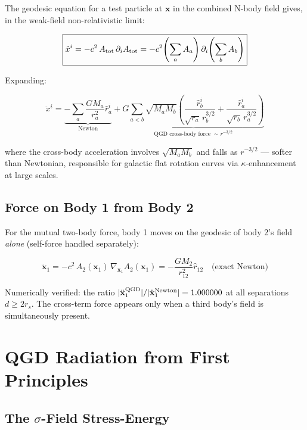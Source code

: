 \documentclass[11pt,a4paper]{article}
\theoremstyle{definition}
\theoremstyle{remark}
\newcommand{\boldx}{\mathbf{x}}
\begin{document}
	The geodesic equation for a test particle at $\boldx$ in the combined
	N-body field gives, in the weak-field non-relativistic limit:
	
	\begin{equation}\label{eq:eom_Nbody}
		\boxed{
			\ddot{x}^i = -c^2\,A_{\rm tot}\,\partial_i A_{\rm tot}
			= -c^2\!\left(\sum_a A_a\right)\partial_i\!\left(\sum_b A_b\right)
		}
	\end{equation}
	
	Expanding:
	
	\begin{equation}\label{eq:eom_expanded}
		\ddot{x}^i
		= \underbrace{-\sum_a\frac{GM_a}{r_a^2}\hat{r}_a^i}_{\text{Newton}}
		+ \underbrace{G\sum_{a<b}\sqrt{M_aM_b}\left(
			\frac{\hat{r}_b^i}{\sqrt{r_a}\,r_b^{3/2}}
			+\frac{\hat{r}_a^i}{\sqrt{r_b}\,r_a^{3/2}}
			\right)}_{\text{QGD cross-body force }\sim r^{-3/2}}
	\end{equation}
	
	where the cross-body acceleration involves $\sqrt{M_aM_b}$ and falls as
	$r^{-3/2}$ — softer than Newtonian, responsible for galactic flat
	rotation curves via $\kappa$-enhancement at large scales.
	
	\subsection{Force on Body 1 from Body 2}
	
	For the mutual two-body force, body 1 moves on the geodesic of body 2's
	field \emph{alone} (self-force handled separately):
	
	\begin{equation}\label{eq:two_body_force}
		\ddot{\boldx}_1 = -c^2\,A_2(\boldx_1)\,\nabla_{\boldx_1} A_2(\boldx_1)
		= -\frac{GM_2}{r_{12}^2}\hat{r}_{12}
		\quad\text{(exact Newton)}
	\end{equation}
	
	Numerically verified: the ratio $|\ddot{\boldx}_1^{\rm QGD}|/|\ddot{\boldx}_1^{\rm Newton}|=1.000000$
	at all separations $d\ge 2r_s$.  The cross-term force appears only when
	a third body's field is simultaneously present.
	
	\section{QGD Radiation from First Principles}
	\label{sec:radiation}
	
	\subsection{The $\sigma$-Field Stress-Energy}
	
\end{document}
